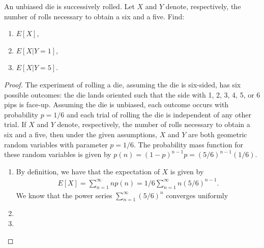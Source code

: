 \begin{problem}{3.8}
  An unbiased die is successively rolled. Let $X$ and $Y$ denote, respectively, the number
  of rolls necessary to obtain a six and a five. Find:
  \begin{enumerate}
    \item $E[X]$,
    \item $E[X|Y=1]$,
    \item $E[X|Y=5]$.
  \end{enumerate}
\end{problem}

\begin{proof}
  The experiment of rolling a die, assuming the die is six-sided, has
  six possible outcomes: the die lands oriented such that the side with 1, 2, 3, 4, 5, or 6
  pips is face-up. Assuming the die is unbiased, each outcome occurs with probability
  $p=1/6$ and each trial of rolling the die is independent of any other trial.
  If $X$ and $Y$ denote, respectively, the number
  of rolls necessary to obtain a six and a five, then under the given assumptions,
  $X$ and $Y$ are both geometric random variables with parameter $p=1/6$.
  The probability mass function for these random variables is given by $p(n) = (1-p)^{n-1}p = (5/6)^{n-1}(1/6)$.

  \begin{enumerate}
    \item By definition, we have that the expectation of $X$ is given by
      \begin{align*}
        E[X] = \sum_{n=1}^\infty n p(n) = 1/6\sum_{n=1}^\infty n(5/6)^{n-1}.
      \end{align*}
      We know that the power series $\sum_{n=1}^\infty (5/6)^{n}$ converges uniformly
    \item
    \item
  \end{enumerate}
\end{proof}
\newpage
